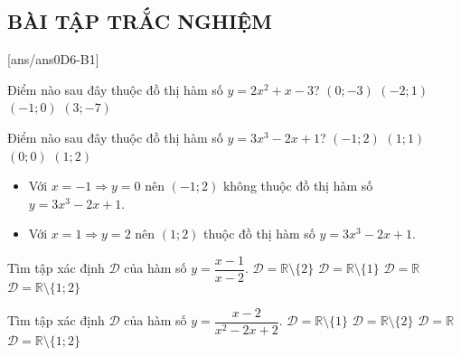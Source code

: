 \subsection{BÀI TẬP TRẮC NGHIỆM}
[ans/ans0D6-B1]

\begin{ex}%
	Điểm nào sau đây thuộc đồ thị hàm số $y = 2x^2 + x - 3$?
	\choice
	{\True $\left(0;-3\right)$}
	{$\left(-2;1\right)$}
	{$\left(-1;0\right)$}
	{$\left(3;-7\right)$}
\end{ex}


\begin{ex}%
	Điểm nào sau đây thuộc đồ thị hàm số  $y=3x^3-2x+1$?
	\choice
	{$\left( -1;2 \right)$}
	{$\left( 1;1 \right)$}
	{$\left( 0;0 \right)$}
	{\True  $\left( 1;2 \right)$}
	\loigiai
	{\begin{itemize}
			\item Với $ x = -1 \Rightarrow y = 0 $ nên $ (-1;2) $ không thuộc đồ thị hàm số $y=3x^3-2x+1$.
			\item Với $ x = 1 \Rightarrow y = 2 $ nên $ (1;2) $ thuộc đồ thị hàm số $y=3x^3-2x+1$.
		\end{itemize}
	}
\end{ex}

\begin{ex}%
	Tìm tập xác định $\mathcal{D}$ của hàm số $y=\dfrac{x-1}{x-2}$.
	\choice
	{\True $\mathcal{D}=\mathbb{R}\setminus\{2\}$}
	{$\mathcal{D}=\mathbb{R}\setminus\{1\}$}
	{$\mathcal{D}=\mathbb{R}$}
	{$\mathcal{D}=\mathbb{R}\setminus\{1;2\}$}
\end{ex}

\begin{ex}%
	Tìm tập xác định $\mathcal{D}$ của hàm số $y=\dfrac{x-2}{x^2-2x+2}$.
	\choice
	{$\mathcal{D}=\mathbb{R}\setminus\{1\}$}
	{$\mathcal{D}=\mathbb{R}\setminus\{2\}$}
	{\True $\mathcal{D}=\mathbb{R}$}
	{$\mathcal{D}=\mathbb{R}\setminus\{1;2\}$}
\end{ex}

